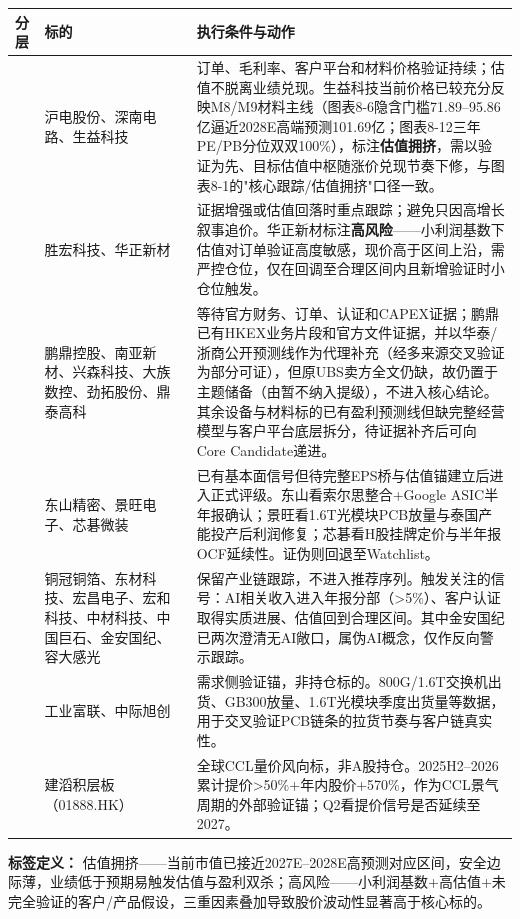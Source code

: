 \begin{exhibitbox}[图表10-1：基于触发器的投资立场与分层]
\small
\begin{tabularx}{\textwidth}{L{2.8cm}X X}
\toprule
\textbf{分层} & \textbf{标的} & \textbf{执行条件与动作} \\
\midrule
{} & 沪电股份、深南电路、生益科技 & 订单、毛利率、客户平台和材料价格验证持续；估值不脱离业绩兑现。生益科技当前价格已较充分反映M8/M9材料主线（图表8-6隐含门槛71.89--95.86亿逼近2028E高端预测101.69亿；图表8-12三年PE/PB分位双双100\%），标注\textbf{估值拥挤}，需以验证为先、目标估值中枢随涨价兑现节奏下修，与图表8-1的"核心跟踪/估值拥挤"口径一致。 \\
\midrule
{} & 胜宏科技、华正新材 & 证据增强或估值回落时重点跟踪；避免只因高增长叙事追价。华正新材标注\textbf{高风险}——小利润基数下估值对订单验证高度敏感，现价高于区间上沿，需严控仓位，仅在回调至合理区间内且新增验证时小仓位触发。 \\
\midrule
{} & 鹏鼎控股、南亚新材、兴森科技、大族数控、劲拓股份、鼎泰高科 & 等待官方财务、订单、认证和CAPEX证据；鹏鼎已有HKEX业务片段和官方文件证据，并以华泰/浙商公开预测线作为代理补充（经多来源交叉验证为部分可证），但原UBS卖方全文仍缺，故仍置于主题储备（由暂不纳入提级），不进入核心结论。其余设备与材料标的已有盈利预测线但缺完整经营模型与客户平台底层拆分，待证据补齐后可向Core Candidate递进。 \\
\midrule
{} & 东山精密、景旺电子、芯碁微装 & 已有基本面信号但待完整EPS桥与估值锚建立后进入正式评级。东山看索尔思整合+Google ASIC半年报确认；景旺看1.6T光模块PCB放量与泰国产能投产后利润修复；芯碁看H股挂牌定价与半年报OCF延续性。证伪则回退至Watchlist。 \\
\midrule
{} & 铜冠铜箔、东材科技、宏昌电子、宏和科技、中材科技、中国巨石、金安国纪、容大感光 & 保留产业链跟踪，不进入推荐序列。触发关注的信号：AI相关收入进入年报分部（>5\%）、客户认证取得实质进展、估值回到合理区间。其中金安国纪已两次澄清无AI敞口，属伪AI概念，仅作反向警示跟踪。 \\
\midrule
{} & 工业富联、中际旭创 & 需求侧验证锚，非持仓标的。800G/1.6T交换机出货、GB300放量、1.6T光模块季度出货量等数据，用于交叉验证PCB链条的拉货节奏与客户链真实性。 \\
\midrule
{} & 建滔积层板（01888.HK） & 全球CCL量价风向标，非A股持仓。2025H2--2026累计提价>50\%+年内股价+570\%，作为CCL景气周期的外部验证锚；Q2看提价信号是否延续至2027。 \\
\bottomrule
\end{tabularx}
\vspace{0.3em}
\scriptsize \textbf{标签定义：} 估值拥挤——当前市值已接近2027E--2028E高预测对应区间，安全边际薄，业绩低于预期易触发估值与盈利双杀；高风险——小利润基数+高估值+未完全验证的客户/产品假设，三重因素叠加导致股价波动性显著高于核心标的。
\end{exhibitbox}

